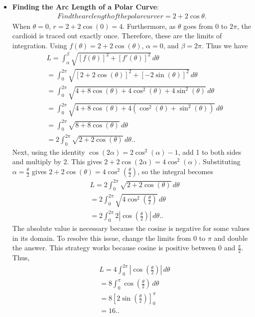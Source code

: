\documentclass{report}
\begin{document}
\begin{itemize}
     \item \textbf{Finding the Arc Length of a Polar Curve}: 
         \begin{align*}
          Find the arc length of the polar curve 
              r = 2 + 2\cos{\theta }
          .\end{align*}
          \bigbreak \noindent 
               When \( \theta = 0 \), \( r = 2 + 2\cos(0) = 4 \). Furthermore, as \( \theta \) goes from \( 0 \) to \( 2\pi \), the cardioid is traced out exactly once. Therefore, these are the limits of integration. Using \( f(\theta) = 2 + 2\cos(\theta) \), \( \alpha = 0 \), and \( \beta = 2\pi \). Thus we have
     \begin{align*}
          &L = \int_{\alpha}^{\beta} \sqrt{[f(\theta)]^2 + [f'(\theta)]^2} \, d\theta  \\
          &= \int_{0}^{2\pi} \sqrt{[2 + 2\cos(\theta)]^2 + [-2\sin(\theta)]^2} \, d\theta  \\
          &= \int_{0}^{2\pi} \sqrt{4 + 8\cos(\theta) + 4\cos^2(\theta) + 4\sin^2(\theta)} \, d\theta  \\
          &= \int_{0}^{2\pi} \sqrt{4 + 8\cos(\theta) + 4(\cos^2(\theta) + \sin^2(\theta))} \, d\theta  \\
          &= \int_{0}^{2\pi} \sqrt{8 + 8\cos(\theta)} \, d\theta  \\
          &= 2 \int_{0}^{2\pi} \sqrt{2 + 2\cos(\theta)} \, d\theta.
     .\end{align*}
     Next, using the identity \( \cos(2\alpha) = 2\cos^2(\alpha) - 1 \), add 1 to both sides and multiply by 2. This gives \( 2 + 2\cos(2\alpha) = 4\cos^2(\alpha) \). Substituting \( \alpha = \frac{\theta}{2} \) gives \( 2 + 2\cos(\theta) = 4\cos^2\left(\frac{\theta}{2}\right) \), so the integral becomes
     \begin{align*}
          &L = 2 \int_{0}^{2\pi} \sqrt{2 + 2\cos(\theta)} \, d\theta  \\
          &= 2 \int_{0}^{2\pi} \sqrt{4\cos^2\left(\frac{\theta}{2}\right)} \, d\theta  \\
          &= 2 \int_{0}^{2\pi} 2 \left| \cos\left(\frac{\theta}{2}\right) \right| \, d\theta. 
     .\end{align*}
     The absolute value is necessary because the cosine is negative for some values in its domain. To resolve this issue, change the limits from \( 0 \) to \( \pi \) and double the answer. This strategy works because cosine is positive between \( 0 \) and \( \frac{\pi}{2} \). Thus,
     \begin{align*}
          &L = 4 \int_{0}^{2\pi} \left| \cos\left(\frac{\theta}{2}\right) \right| \, d\theta  \\
          &= 8 \int_{0}^{\pi} \cos\left(\frac{\theta}{2}\right) \, d\theta  \\
          &= 8 \left[ 2\sin\left(\frac{\theta}{2}\right) \right]_{0}^{\pi}  \\
          &= 16. 
     .\end{align*}


    \end{itemize}
\end{document}
